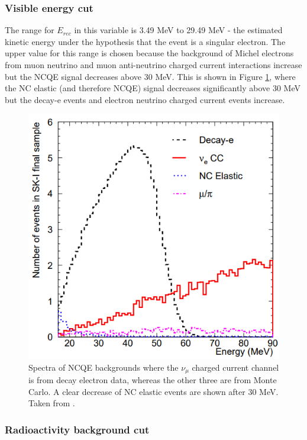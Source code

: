 \subsubsection{Visible energy cut}
The range for $E_{rec}$ in this variable is 3.49 MeV to 29.49 MeV - the estimated kinetic energy under the hypothesis that the event is a singular electron. The upper value for this range is chosen because the background of Michel electrons from muon neutrino and muon anti-neutrino charged current interactions increase but the NCQE signal decreases above 30 MeV. This is shown in Figure \ref{fig:michel_electron}, where the NC elastic (and therefore NCQE) signal decreases significantly above 30 MeV but the decay-e events and electron neutrino charged current events increase.

\begin{figure}
\includegraphics[width=\textwidth]{Figures/michel_electron.png}
\caption{Spectra of NCQE backgrounds where the $\nu_{\mu}$ charged current channel is from decay electron data, whereas the other three are from Monte Carlo. A clear decrease of NC elastic events are shown after 30 MeV. Taken from \cite{michel_electron}. }
\label{fig:michel_electron}
\end{figure} 

\subsubsection{Radioactivity background cut}

